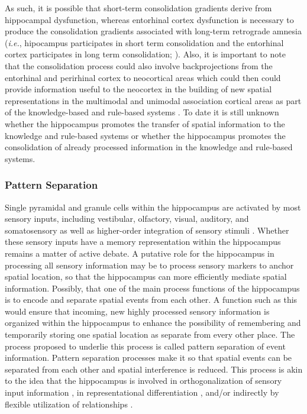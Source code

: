 \documentclass[doc, longtable]{apa6}
\begin{document}
As such, it is possible that short-term consolidation gradients derive from hippocampal dysfunction, whereas entorhinal cortex dysfunction is necessary to produce the consolidation gradients associated with long-term retrograde amnesia (\textit{i.e.}, hipocampus participates in short term consolidation and the entorhinal cortex participates in long term consolidation; \cite{Cho1995b, Cho1995c}). Also, it is important to note that the consolidation process could also involve backprojections from the entorhinal and perirhinal cortex to neocortical areas which could then could provide information useful to the neocortex in the building of new spatial representations in the multimodal and unimodal association cortical areas as part of the knowledge-based and rule-based systems \parencite{Lavenex2000a, Preston2005}. To date it is still unknown whether the hippocampus promotes the transfer of spatial information to the knowledge and rule-based systems or whether the hippocampus promotes the consolidation of already processed information in the knowledge and rule-based systems.

\subsubsection{Pattern Separation}
Single pyramidal and granule cells within the hippocampus are activated by most sensory inputs, including vestibular, olfactory, visual, auditory, and somatosensory as well as higher-order integration of sensory stimuli \parencite{Eichenbaum1993b}. Whether these sensory inputs have a memory representation within the hippocampus remains a matter of active debate. A putative role for the hippocampus in processing all sensory information may be to process sensory markers to anchor spatial location, so that the hippocampus can more efficiently mediate spatial information. Possibly, that one of the main process functions of the hippocampus is to encode and separate spatial events from each other. A function such as this would ensure that incoming, new highly processed sensory information is organized within the hippocampus to enhance the possibility of remembering and temporarily storing one spatial location as separate from every other place. The process proposed to underlie this process is called pattern separation of event information. Pattern separation processes make it so that spatial events can be separated from each other and spatial interference is reduced. This process is akin to the idea that the hippocampus is involved in orthogonalization of sensory input information \parencite{Hunsaker2007c,hunsaker2013operation, Kesner2002, Kesner2013e, Rolls1989a}, in representational differentiation \parencite{Gluck1997b}, and/or indirectly by flexible utilization of relationships \parencite{Eichenbaum1993b}. 
	
\end{document}
